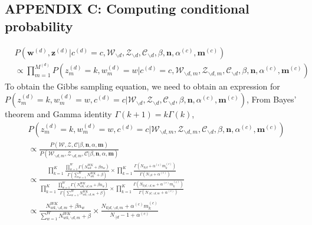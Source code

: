 \documentclass[a4paper]{article}
\begin{document}
  \subsection*{APPENDIX C: Computing conditional probability}
  \begin{equation}
  \begin{aligned}
  & P(\boldsymbol{w}^{(d)}, \boldsymbol{z}^{(d)}|c^{(d)}=c, \mathcal{W}_{\backslash d}, \mathcal{Z}_{\backslash d}, \mathcal{C}_{\backslash d}, \beta, \boldsymbol{n}, \alpha^{(c)}, \boldsymbol{m}^{(c)}) \\& \propto \prod_{m=1}^{M^{(d)}}P(z^{(d)}_m=k, w^{(d)}_m=w| c^{(d)}=c, \mathcal{W}_{\backslash d, m}, \mathcal{Z}_{\backslash d,m}, \mathcal{C}_{\backslash d}, \beta, \boldsymbol{n}, \alpha^{(c)}, \boldsymbol{m}^{(c)})
  \end{aligned}
  \end{equation} 
  To obtain the Gibbs sampling equation, we need to obtain an expression for $P(z^{(d)}_m=k,  w^{(d)}_m=w, c^{(d)}=c|\mathcal{W}_{\backslash d}, \mathcal{Z}_{\backslash d}, \mathcal{C}_{\backslash d}, \beta, \boldsymbol{n}, \alpha^{(c)}, \boldsymbol{m}^{(c)})$,
  From Bayes' theorem and Gamma identity $\Gamma(k+1)=k\Gamma(k)$,
  \begin{equation}
  \begin{aligned}
  & P(z^{(d)}_m=k, w^{(d)}_m=w, c^{(d)}=c|\mathcal{W}_{\backslash d, m}, \mathcal{Z}_{\backslash d,m}, \mathcal{C}_{\backslash d}, \beta, \boldsymbol{n}, \alpha^{(c)}, \boldsymbol{m}^{(c)}) \\& \propto 
  \frac{P(\mathcal{W}, \mathcal{Z}, \mathcal{C}|\beta, \boldsymbol{n}, \alpha, \boldsymbol{m})}{P(\mathcal{W}_{\backslash d, m}, \mathcal{Z}_{\backslash d, m}, \mathcal{C}|\beta, \boldsymbol{n}, \alpha, \boldsymbol{m})}\\& \propto \frac{\prod_{k=1}^{K}\frac{\prod_{w=1}^W\Gamma(N_{wk}^{WK}+\beta n_w)}{\Gamma(\sum_{w=1}^WN_{wk}^{WK}+\beta )}\times\prod_{k=1}^K\frac{\Gamma(N_{k|d}+\alpha^{(c)} m^{(c)}_k)}{\Gamma(N_{\cdot|d}+\alpha^{(c)})}}{\prod_{k=1}^{K}\frac{\prod_{w=1}^W\Gamma(N_{wk, \backslash d, m}^{WK}+\beta n_w)}{\Gamma(\sum_{w=1}^WN_{wk, \backslash d, m}^{WK}+\beta )}\times\prod_{k=1}^K\frac{\Gamma(N_{k|d, \backslash d, m}+\alpha^{(c)} m^{(c)}_k)}{\Gamma(N_{\cdot|d, \backslash d, m}+\alpha^{(c)})}}\\ & \propto 
  \frac{N_{wk, \backslash d, m}^{WK}+\beta n_w}{\sum_{w=1}^WN_{wk,  \backslash d, m}^{WK}+\beta}\times\frac{N_{k|d, \backslash d, m}+\alpha^{(c)} m^{(c)}_k}{N_{\cdot|d}-1+\alpha^{(c)}}
  \end{aligned}
  \end{equation}
\end{document}

